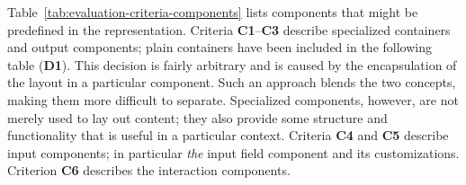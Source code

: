 Table~\ref{tab:evaluation-criteria-components} lists components that might be predefined in the representation.
Criteria \textbf{C1}--\textbf{C3} describe specialized containers and output components;
plain containers have been included in the following table (\textbf{D1}).
This decision is fairly arbitrary and is caused by the encapsulation of the layout in a particular component.
Such an approach blends the two concepts, making them more difficult to separate.
Specialized components, however, are not merely used to lay out content;
they also provide some structure and functionality that is useful in a particular context.
Criteria \textbf{C4} and \textbf{C5} describe input components;
in particular \emph{the} input field component and its customizations.
Criterion \textbf{C6} describes the interaction components.

